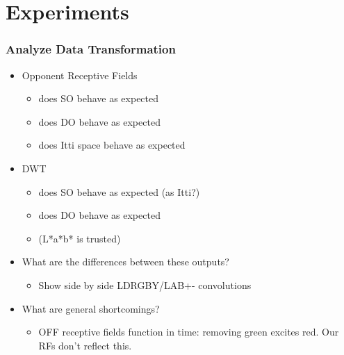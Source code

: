 \documentclass[journal,onecolumn]{IEEEtran}
\begin{document}
%
%
%
\section{Experiments}

\subsubsection{Analyze Data Transformation}
\begin{itemize}
    \item Opponent Receptive Fields
    \begin{itemize}
        \item does SO behave as expected
        \item does DO behave as expected
        \item does Itti space behave as expected
    \end{itemize}
    \item DWT
    \begin{itemize}
        \item does SO behave as expected (as Itti?)
        \item does DO behave as expected
        \item (L*a*b* is trusted)
    \end{itemize}
    \item What are the differences between these outputs?
    \begin{itemize}
        \item Show side by side LDRGBY/LAB+- convolutions
    \end{itemize}
    \item What are general shortcomings?
    \begin{itemize}
        \item OFF receptive fields function in time: removing green excites red. Our RFs don't reflect this.
    \end{itemize}
\end{itemize}
\end{document}
